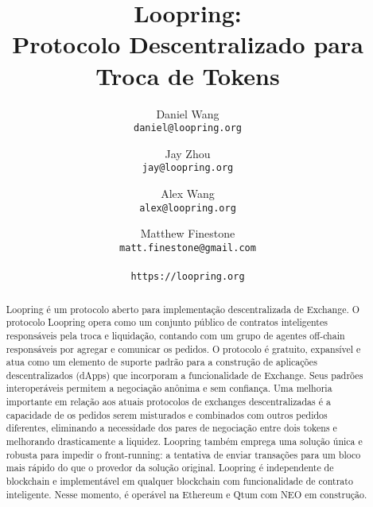 \documentclass[UTF8,nofonts]{article}
\title{\textbf{Loopring:}\\\textbf{Protocolo Descentralizado para Troca de Tokens}}
\author{
  Daniel Wang\\
  \texttt{daniel@loopring.org}\\
  \and
  	Jay Zhou\\
  	\texttt{jay@loopring.org}\\
  	\and
  	Alex Wang\\
  	\texttt{alex@loopring.org}\\
  	\and
  	Matthew Finestone\\
  	\texttt{matt.finestone@gmail.com}\\ 
  \\
  \texttt{https://loopring.org}
 }
\begin{document}
\maketitle


\begin{abstract}
Loopring é um protocolo aberto para implementação descentralizada de Exchange. O protocolo Loopring opera como um conjunto público de contratos inteligentes responsáveis pela troca e liquidação, contando com um grupo de agentes off-chain responsáveis por agregar e comunicar os pedidos. O protocolo é gratuito, expansível e atua como um elemento de suporte padrão para a construção de aplicações descentralizados (dApps) que incorporam a funcionalidade de Exchange. Seus padrões interoperáveis permitem a negociação anônima e sem confiança. Uma melhoria importante em relação aos atuais protocolos de exchanges descentralizadas é a capacidade de os pedidos serem misturados e combinados com outros pedidos diferentes, eliminando a necessidade dos pares de negociação entre dois tokens e melhorando drasticamente a liquidez. Loopring também emprega uma solução única e robusta para impedir o front-running: a tentativa de enviar transações para um bloco mais rápido do que o provedor da solução original. Loopring é independente de blockchain e implementável em qualquer blockchain com funcionalidade de contrato inteligente. Nesse momento, é operável na Ethereum\cite{buterin2017ethereum} \cite{wood2014ethereum} e Qtum \cite{dai2017smart} com NEO \cite{atterlonn2018distributed} em construção.
\end{abstract}
\end{document}
